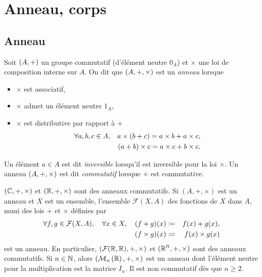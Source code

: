 \documentclass{magnolia}
\begin{document}
\magtoc


\section{Anneau, corps}
\subsection{Anneau}

\begin{definition}
Soit $\left(A,+\right)$ un groupe commutatif (d'élément neutre $0_A$) et $\times$ une
loi de composition interne sur $A$. On dit que $\left(A,+,\times\right)$ est un \emph{anneau}
lorsque
\begin{itemize}
\item $\times$ est associatif,
\item $\times$ admet un élément neutre $1_A$,
\item $\times$ est distributive par rapport à $+$
  \begin{eqnarray*}
  \forall a,b,c\in A, & & a\times\left(b+c\right)=a\times b+a\times c,\\    
                     & & \left(a+b\right)\times c=a\times c+b\times c.
  \end{eqnarray*}
\end{itemize}
Un élément $a\in A$ est dit \emph{inversible} lorsqu'il est inversible pour la loi
$\times$. Un anneau $\left(A,+,\times\right)$ est dit \emph{commutatif} lorsque $\times$ est
commutative.
\end{definition}

\begin{exemples}
\exemple $(\mathbb{C},+,\times)$ et $(\mathbb{R},+,\times)$ sont des anneaux commutatifs.
\exemple Si $(A,+,\times)$ est un anneau et $X$ est un ensemble,
  l'ensemble $\mathcal{F}(X,A)$ des fonctions de $X$ dans $A$, muni des lois $+$ et $\times$ définies par
  \begin{eqnarray*}
  \forall f,g\in\mathcal{F}(X,A) ,\quad \forall x\in X ,\quad (f+g)(x)&\coloneqq&f(x)+g(x),\\
                                              (f\times g)(x)&\coloneqq&f(x)\times g(x)
  \end{eqnarray*}
  est un anneau. En particulier, $(\mathcal{F}(\mathbb{R},\mathbb{R}),+,\times)$ et
  $(\mathbb{R}^{\mathbb{N}},+,\times)$ sont des anneaux commutatifs.
\exemple Si $n\in\mathbb{N}$, alors $(\mathcal{M}_{n}\left(\mathbb{R}\right),+,\times)$ est un anneau dont l'élément neutre
  pour la multiplication est la matrice $I_n$. Il est non commutatif dès que
  $n\geq 2$.
\end{exemples}
\end{document}
